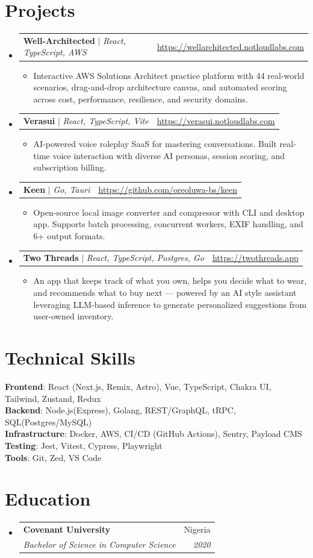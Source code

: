 \documentclass[letterpaper,11pt]{article}
\makeatletter
\newcommand{\resumeItem}[1]{
  \item\small{
    {#1 \vspace{-2pt}}
  }
}
\newcommand{\resumeSubheading}[4]{
  \vspace{-2pt}\item
    \begin{tabular*}{0.97\textwidth}[t]{l@{\extracolsep{\fill}}r}
      \textbf{#1} & #2 \\
      \textit{\small#3} & \textit{\small #4} \\
    \end{tabular*}\vspace{-7pt}
}
\newcommand{\resumeProjectHeading}[2]{
    \item
    \begin{tabular*}{0.97\textwidth}{l@{\extracolsep{\fill}}r}
      \small#1 & #2 \\
    \end{tabular*}\vspace{-7pt}
}
\newcommand{\resumeSubHeadingListStart}{\begin{itemize}[leftmargin=0.15in, label={}]}
\newcommand{\resumeSubHeadingListEnd}{\end{itemize}}
\newcommand{\resumeItemListStart}{\begin{itemize}}
\newcommand{\resumeItemListEnd}{\end{itemize}\vspace{-5pt}}
\makeatother
\begin{document}
\section{Projects}
    \resumeSubHeadingListStart
      \resumeProjectHeading
          {\textbf{Well-Architected} $|$ \emph{React, TypeScript, AWS}}{\url{https://wellarchitected.notloudlabs.com}}
          \resumeItemListStart
            \resumeItem{Interactive AWS Solutions Architect practice platform with 44 real-world scenarios, drag-and-drop architecture canvas, and automated scoring across cost, performance, resilience, and security domains.}
          \resumeItemListEnd
      \resumeProjectHeading
          {\textbf{Verasui} $|$ \emph{React, TypeScript, Vite}}{\url{https://verasui.notloudlabs.com}}
          \resumeItemListStart
            \resumeItem{AI-powered voice roleplay SaaS for mastering conversations. Built real-time voice interaction with diverse AI personas, session scoring, and subscription billing.}
          \resumeItemListEnd
      \resumeProjectHeading
          {\textbf{Keen} $|$ \emph{Go, Tauri}}{\url{https://github.com/oreoluwa-bs/keen}}
          \resumeItemListStart
            \resumeItem{Open-source local image converter and compressor with CLI and desktop app. Supports batch processing, concurrent workers, EXIF handling, and 6+ output formats.}
          \resumeItemListEnd
      \resumeProjectHeading
          {\textbf{Two Threads} $|$ \emph{React, TypeScript, Postgres, Go}}{\url{https://twothreads.app}}
          \resumeItemListStart
            \resumeItem{An app that keeps track of what you own, helps you decide what to wear, and recommends what to buy next — powered by an AI style assistant leveraging LLM-based inference to generate personalized suggestions from user-owned inventory.}
          \resumeItemListEnd
    \resumeSubHeadingListEnd



\section{Technical Skills}
 \begin{itemize}[leftmargin=0.15in, label={}]
    \small{\item{
     \textbf{Frontend}{: React (Next.js, Remix, Astro), Vue, TypeScript, Chakra UI, Tailwind, Zustand, Redux} \\
     \textbf{Backend}{: Node.js(Express), Golang, REST/GraphQL, tRPC, SQL(Postgres/MySQL)} \\
     \textbf{Infrastructure}{: Docker, AWS, CI/CD (GitHub Actions), Sentry, Payload CMS} \\
     \textbf{Testing}{: Jest, Vitest, Cypress, Playwright} \\
     \textbf{Tools}{: Git, Zed, VS Code} \\
    }}
 \end{itemize}


\section{Education}
\resumeSubHeadingListStart
    \resumeSubheading
    {Covenant University}{Nigeria}
    {Bachelor of Science in Computer Science}{2020}
\resumeSubHeadingListEnd


\end{document}
